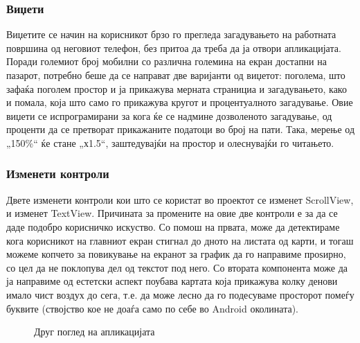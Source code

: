 \documentclass{uvamscse}
\begin{document}
\subsubsection{Виџети}

Виџетите се начин на корисникот брзо го прегледа загадувањето на работната површина од неговиот телефон, без притоа да треба да ја отвори апликацијата. Поради големиот број мобилни со различна  големина на екран достапни на пазарот, потребно беше да се направат две варијанти од виџетот: поголема, што зафаќа поголем простор и ја прикажува мерната странициа и загадувањето, како и помала, која што само го прикажува кругот и процентуалното загадување. Овие виџети се испрограмирани за кога ќе се надмине дозволеното загадување, од проценти да се претворат прикажаните податоци во број на пати. Така, мерење од „150\%“ ќе стане „х1.5“, заштедувајќи на простор и олеснувајќи го читањето.

\subsubsection{Изменети контроли}

Двете изменети контроли кои што се користат во проектот се изменет ScrollView, и изменет TextView. Причината за промените на овие две контроли е за да се даде подобро корисничко искуство. Со помош на првата, може да детектираме кога корисникот на главниот екран стигнал до дното на листата од карти, и тогаш можеме копчето за повикување на екранот за график да го направиме проѕирно, со цел да не поклопува дел од текстот под него. Со втората компонента може да ја направиме од естетски аспект поубава картата која прикажува колку денови имало чист воздух до сега, т.е. да може лесно да го подесуваме просторот помеѓу буквите (ствојство кое не доаѓа само по себе во Android околината).

\begin{figure}[H]
\centering
  \caption{Друг поглед на апликацијата}
  \label{fig:controls}
\end{figure}
\end{document}

